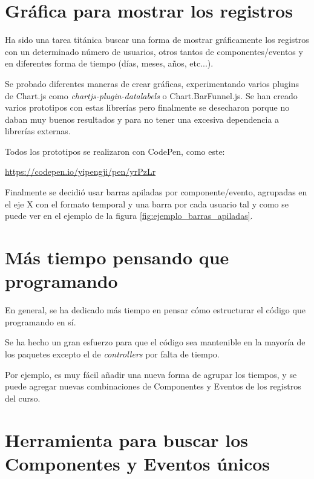\section{Gráfica para mostrar los registros}

Ha sido una tarea titánica buscar una forma de mostrar gráficamente los registros con un determinado número de usuarios, otros tantos de componentes/eventos y en diferentes forma de tiempo (días, meses, años, etc...).

Se probado diferentes maneras de crear gráficas, experimentando varios plugins de Chart.js \cite{noauthor_plugins_nodate} como \textit{chartjs-plugin-datalabels} \cite{noauthor_chartjs-plugin-datalabels_nodate} o Chart.BarFunnel.js\cite{noauthor_bar_2019}. Se han creado varios prototipos con estas librerías pero finalmente se desecharon porque no daban muy buenos resultados y para no tener una excesiva dependencia a librerías externas.

Todos los prototipos se realizaron con CodePen, como este:

\href{https://codepen.io/yipengji/pen/yrPzLr}{https://codepen.io/yipengji/pen/yrPzLr}


Finalmente se decidió usar barras apiladas por componente/evento, agrupadas en el eje X con el formato temporal y una barra por cada usuario tal y como se puede ver en el ejemplo de la figura \ref{fig:ejemplo_barras_apiladas}.



\section{Más tiempo pensando que programando}

En general, se ha dedicado más tiempo en pensar cómo estructurar el código que programando en sí. 

Se ha hecho un gran esfuerzo para que el código sea mantenible en la mayoría de los paquetes excepto el de \textit{controllers} por falta de tiempo.

Por ejemplo, es muy fácil añadir una nueva forma de agrupar los tiempos, y se puede agregar nuevas combinaciones de Componentes y Eventos de los registros del curso.

\section{Herramienta para buscar los Componentes y Eventos únicos}\label{sec:componeteyevento}

